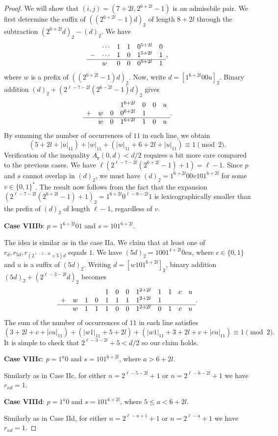 \documentclass[a4paper,11pt]{amsart}
\theoremstyle{definition}
\begin{document}
\begin{proof}
We will show that $(i,j) = (7+2l, 2^{6+2l}-1)$ is an admissbile pair.
We first determine the suffix of $((2^{6+2l}-1)d)_2$ of length $8+2l$ through the subtraction $(2^{6+2l}d)_2 - (d)_2$.  We have
$$ \begin{array}{llllll}
	   & \cdots & 1 & 1 & 0^{5+2l} & 0 \\
 -     & \cdots  & 1 & 0 & 1^{5+2l} & 1 \\     
\hline & w & 0 & 0 & 0^{5+2l} & 1
\end{array},$$ 
where $w$ is a prefix of $((2^{6+2l}-1)d)_2$. Now,  write $d = [1^{6+2l}00u]_2$. Binary addition $(d)_2+(2^{\ell-7-2l}(2^{6-2l}-1)d)_2$ gives
$$\begin{array}{lllllll}
       &   &   & 1^{6+2l}  & 0 & 0 & u  \\
+      & w & 0 & 0^{6+2l} & 1 &  &     \\
\hline & w & 0 & 1^{6+2l} & 1 & 0 & u
\end{array}.$$
By summing the number of occurrences of $11$ in each line, we obtain 
$$(5+2l +|u|_{11}) + |w|_{11} + (|w|_{11}+6+2l+|u|_{11}) \equiv 1 \pmod{2}.$$ 
Verification of the inequality $A_{\mathbf{r}}(0,d) <d/2$ requires a bit more care compared to the previous cases.
We have $\ell(2^{\ell-7-2l}(2^{6+2l}-1) +1) = \ell-1$. Since $p$ and $s$ cannot overlap in $(d)_2$, we must have $(d)_2 = 1^{6+2l}00v101^{6+2l}$ for some $v \in \{0,1\}^*$. The result now follows from the fact that the expansion $(2^{\ell-7-2l}(2^{6+2l}-1) +1)_2 = 1^{6+2l} 0^{\ell-8-2l} 1$ is lexicographically smaller than the prefix of $(d)_2$ of length $\ell-1$, regardless of $v$.

\textbf{Case VIIIb}: $p = 1^{6+2l}01$ and $s=101^{6+2l}$.

The idea is similar as in the case IIa. We claim that at least one of $r_{d}, r_{5d}, r_{(2^{\ell-3-2l}+5)d}$ equals $1$. We have $(5d)_2 = 1 0 0 1^{4+2l}  0  c  u $, where $c \in \{0,1\}$ and $u$ is a suffix of $(5d)_2$. Writing $d = [w101^{6+2l}]_2$, binary addition $(5d)_2 + (2^{\ell-3-2l}d)_2$ becomes
$$
\begin{array}{llllllllllll}
       &   &   &   & 1 & 0 & 0 & 1^{2+2l} & 1 & 1 & c & u \\
+      & w & 1 & 0 & 1 & 1 & 1 & 1^{2+2l} & 1 &   &   &   \\
\hline & w & 1 & 1 & 1 & 0 & 0 & 1^{2+2l} & 0 & 1 & c & u
\end{array}.
$$
The sum of the number of occurrences of $11$ in each line satisfies 
$$ (3+2l+c + |cu|_{11}) + (|w1|_{11}+ 5+2l) + (|w1|_{11}+3+2l+c+|cu|_{11}) \equiv 1 \pmod{2}.  $$
It is simple to check that $2^{\ell-3-2l}+5<d/2$ so our claim holds.

\textbf{Case VIIIc}: $p = 1^{a}0$ and $s=101^{6+2l}$, where $a > 6+2l$.

Similarly as in Case IIc, for either $n = 2^{\ell-5-2l}+1$ or $n = 2^{\ell-6-2l}+1$ we have $r_{nd} = 1$.

\textbf{Case VIIId}: $p = 1^{a}0$ and $s=101^{6+2l}$, where $5 \leq a < 6+2l$.

Similarly as in Case IId, for either  $n = 2^{\ell-a+1}+1$ or $n = 2^{\ell-a}+1$ we have $r_{nd} = 1$.
\end{proof}
\end{document}
